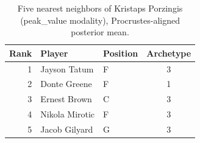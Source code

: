 \begin{table}[htbp]
  \centering\small
  \begin{tabular}{rllc}
    \toprule
    Rank & Player & Position & Archetype \\
    \midrule
    1 & Jayson Tatum & F & 3 \\
    2 & Donte Greene & F & 1 \\
    3 & Ernest Brown & C & 3 \\
    4 & Nikola Mirotic & F & 3 \\
    5 & Jacob Gilyard & G & 3 \\
    \bottomrule
  \end{tabular}
  \caption{Five nearest neighbors of Kristaps Porzingis (peak_value modality), Procrustes-aligned posterior mean.}
  \label{tab:Kristaps_Porzingis_neighbors_peak_value}
\end{table}

